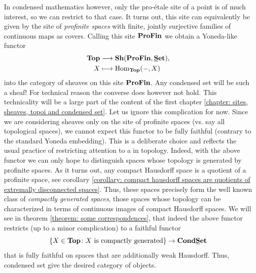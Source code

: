 In condensed mathematics however, only the pro-étale site of a point is of much interest, so we can restrict to that case. It turns out, this site can equivalently be given by the site of \emph{profinite spaces} with finite, jointly surjective families of continuous maps as covers. Calling this site ${\mathbf{ProFin}}$ we obtain a Yoneda-like functor
\begin{align*}
	\Top &\longrightarrow \Sheaves{\proFiniteSets}{\Set},\\
	X&\longmapsto \Hom_\Top(-, X)
\end{align*}
into the category of sheaves on this site ${\mathbf{ProFin}}$. Any condensed set will be such a sheaf! For technical reason the converse does however not hold. This technicality will be a large part of the content of the first chapter \ref{chapter: sites, sheaves, topoi and condensed set}. Let us ignore this complication for now. Since we are considering sheaves only on the site of profinite spaces (vs. say all topological spaces), we cannot expect this functor to be fully faithful (contrary to the standard Yoneda embedding). This is a deliberate choice and reflects the usual practice of restricting attention to a  in topology. Indeed, with the above functor we can only hope to distinguish spaces whose topology is generated by profinite spaces. As it turns out, any compact Hausdorff space is a quotient of a profinite space, see corollary \ref{corollary: compact hausdorff spaces are quotients of extremally disconnected spaces}. Thus, these  spaces precisely form the well known class of \emph{compactly generated spaces}, \ie those spaces whose topology can be characterized in terms of continuous images of compact Hausdorff spaces. We will see in theorem \ref{theorem: some correspondences}, that indeed the above functor restricts (up to a minor complication) to a faithful functor
	$$\{X\in {{\mathbf{Top}}} \colon X\text{ is compactly generated}\} \to {{{\mathbf{Cond}}}{{\mathbf{\underline{S}et}}}}$$
that is fully faithful on spaces that are additionally weak Hausdorff. Thus, condensed set give the desired  category of  objects.

